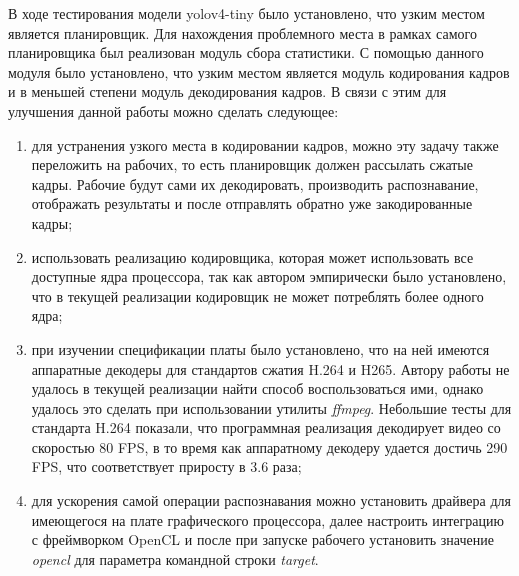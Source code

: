 В ходе тестирования модели yolov4-tiny было установлено, что узким местом является планировщик. Для нахождения проблемного
места в рамках самого планировщика был реализован модуль сбора статистики. С помощью данного модуля было установлено, что
узким местом является модуль кодирования кадров и в меньшей степени модуль декодирования кадров. В связи с этим для
улучшения данной работы можно сделать следующее:

\begin{enumerate}
\item для устранения узкого места в кодировании кадров, можно эту задачу также переложить на рабочих, то есть планировщик
должен рассылать сжатые кадры. Рабочие будут сами их декодировать, производить распознавание, отображать результаты и
после отправлять обратно уже закодированные кадры;
\item использовать реализацию кодировщика, которая может использовать все доступные ядра процессора, так как автором 
эмпирически было установлено, что в текущей реализации кодировщик не может потреблять более одного ядра;
\item при изучении спецификации платы было установлено, что на ней имеются аппаратные декодеры для стандартов сжатия
H.264 и H265. Автору работы не удалось в текущей реализации найти способ воспользоваться ими, однако удалось это сделать
при использовании утилиты \emph{ffmpeg}. Небольшие тесты для стандарта H.264 показали, что программная реализация декодирует 
видео со скоростью 80 FPS, в то время как аппаратному декодеру удается достичь 290 FPS, что соответствует приросту в 3.6 раза;
\item для ускорения самой операции распознавания можно установить драйвера для имеющегося на плате графического процессора, 
далее настроить интеграцию с фреймворком OpenCL и после при запуске рабочего установить значение \emph{opencl} для
параметра командной строки \emph{target}.
\end{enumerate}

\clearpage
